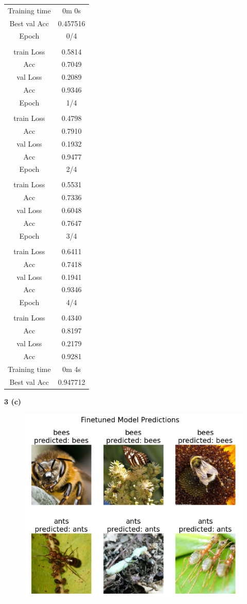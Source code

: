 \documentclass[12 pt]{article}        	%
\begin{document}
\begin{multicols}{2}
\begin{tabular}{ | c | c | } \hline
  Training time & 0m 0s \\
  Best val Acc & 0.457516 \\
  Epoch & 0/4 \\ \hline
        & \\
  train Loss & 0.5814 \\
  Acc & 0.7049 \\
  val Loss & 0.2089 \\
  Acc & 0.9346 \\
  Epoch & 1/4 \\ \hline
        & \\
  train Loss & 0.4798 \\
  Acc & 0.7910 \\
  val Loss & 0.1932 \\ 
  Acc & 0.9477 \\
  Epoch & 2/4 \\ \hline
        & \\
  train Loss & 0.5531 \\
  Acc & 0.7336 \\
  val Loss & 0.6048 \\
  Acc & 0.7647 \\
  Epoch & 3/4 \\ \hline
        & \\
  train Loss & 0.6411 \\
  Acc & 0.7418 \\
  val Loss & 0.1941 \\
  Acc & 0.9346 \\
  Epoch & 4/4 \\ \hline
        & \\
  train Loss & 0.4340 \\
  Acc & 0.8197 \\
  val Loss & 0.2179 \\
  Acc & 0.9281 \\
  Training time & 0m 4s \\
  Best val Acc & 0.947712 \\ \hline
\end{tabular}

\end{multicols}

\newpage

\textbf{3 (c)}

\begin{figure}[h!]
  \includegraphics[width=0.6\linewidth]{tl_finetuned.png}
\end{figure}
\end{document}
